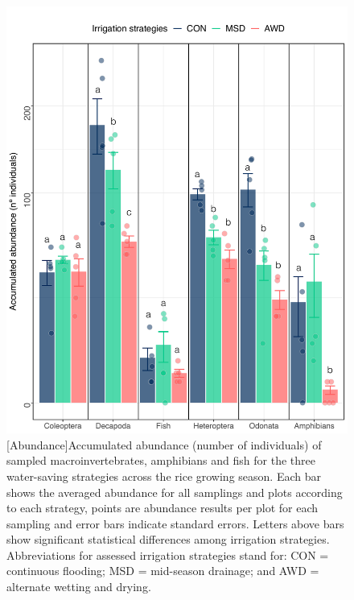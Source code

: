 \begin{figure} [ht]
\captionsetup{justification=justified}
	\centering 
	\includegraphics[scale=0.4, center]{Figures/Chapter_1/Abu.div_2022_avg_plots.9.pdf}
	[Abundance]{Accumulated abundance (number of individuals) of sampled macroinvertebrates, amphibians and fish for the three water-saving strategies across the rice growing season. Each bar shows the averaged abundance for all samplings and plots according to each strategy, points are abundance results per plot for each sampling and error bars indicate standard errors. Letters above bars show significant statistical differences among irrigation strategies. Abbreviations for assessed irrigation strategies stand for: CON = continuous flooding; MSD = mid-season drainage; and AWD = alternate wetting and drying.}   
	\label{Abu}
\end{figure}

